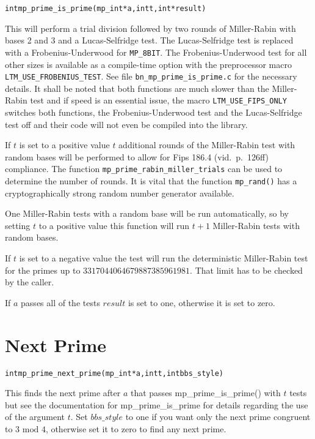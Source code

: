 \documentclass[synpaper]{book}
\begin{document}
\begin{alltt}
int mp_prime_is_prime (mp_int * a, int t, int *result)
\end{alltt}
This will perform a trial division followed by two rounds of Miller-Rabin with bases 2 and 3 and a Lucas-Selfridge test. The Lucas-Selfridge test is replaced with a Frobenius-Underwood for \texttt{MP\_8BIT}. The Frobenius-Underwood test for all other sizes is available as a compile-time option with the preprocessor macro \texttt{LTM\_USE\_FROBENIUS\_TEST}. See file
\texttt{bn\_mp\_prime\_is\_prime.c} for the necessary details. It shall be noted that both functions are much slower than
the Miller-Rabin test and if speed is an essential issue, the macro \texttt{LTM\_USE\_FIPS\_ONLY} switches both functions, the Frobenius-Underwood test and the Lucas-Selfridge test off and their code will not even be compiled into the library.

If $t$ is set to a positive value $t$ additional rounds of the Miller-Rabin test with random bases will be performed to allow for Fips 186.4 (vid.~p.~126ff) compliance. The function \texttt{mp\_prime\_rabin\_miller\_trials} can be used to determine the number of rounds. It is vital that the function \texttt{mp\_rand()} has a cryptographically strong random number generator available.

One Miller-Rabin tests with a random base will be run automatically, so by setting $t$ to a positive value this function will run $t + 1$ Miller-Rabin tests with random bases.

If  $t$ is set to a negative value the test will run the deterministic Miller-Rabin test for the primes up to $3317044064679887385961981$. That limit has to be checked by the caller.

If $a$ passes all of the tests $result$ is set to one, otherwise it is set to zero.

\section{Next Prime}
\begin{alltt}
int mp_prime_next_prime(mp_int *a, int t, int bbs_style)
\end{alltt}
This finds the next prime after $a$ that passes mp\_prime\_is\_prime() with $t$ tests but see the documentation for
mp\_prime\_is\_prime for details regarding the use of the argument $t$.  Set $bbs\_style$ to one if you
want only the next prime congruent to $3 \mbox{ mod } 4$, otherwise set it to zero to find any next prime.
\end{document}
